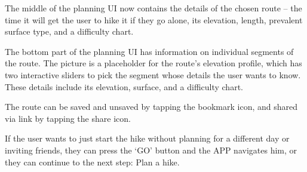 The middle of the planning UI now contains the details of the chosen route -- the time it will get the user to hike it if they go alone, its elevation, length, prevalent surface type, and a difficulty chart.

The bottom part of the planning UI has information on individual segments of the route.
The picture is a placeholder for the route's elevation profile, which has two interactive sliders to pick the segment whose details the user wants to know.
These details include its elevation, surface, and a difficulty chart.

The route can be saved and unsaved by tapping the bookmark icon, and shared via link by tapping the share icon.

If the user wants to just start the hike without planning for a different day or inviting friends, they can press the `GO' button and the APP navigates him,
or they can continue to the next step: Plan a hike.

